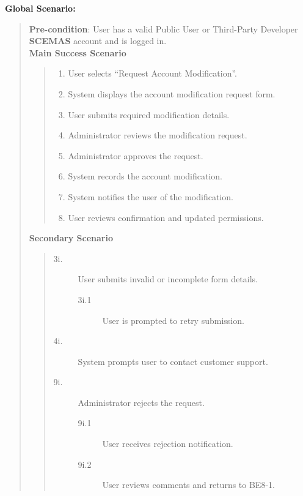 \documentclass[]{article}
\begin{document}
\begin{enumerate}[{\bf BE8.}]
\begin{enumerate}[{\bf VP1.}]
        
\end{enumerate}
{\bf Global Scenario:}
        \begin{quote}
            \textbf{Pre-condition}: User has a valid Public User or Third-Party Developer \textbf{SCEMAS} account and is logged in. \\
            \textbf{Main Success Scenario}
            \begin{quote}
                \begin{enumerate}[1.]
                    \item User selects ``Request Account Modification''.
                    \item System displays the account modification request form.
                    \item User submits required modification details.
                    \item Administrator reviews the modification request.
                    \item Administrator approves the request.
                    \item System records the account modification.
                    \item System notifies the user of the modification.
                    \item User reviews confirmation and updated permissions.
                \end{enumerate}
            \end{quote}
            \textbf{Secondary Scenario}
            \begin{quote}
                \begin{description}
                    \item[\textmd{3i.}] User submits invalid or incomplete form details.
                    \begin{description}
                        \item[\textmd{3i.1}] User is prompted to retry submission.
                    \end{description}
                    \item[\textmd{4i.}] System prompts user to contact customer support.
                    \item[\textmd{9i.}] Administrator rejects the request.
                    \begin{description}
                        \item[\textmd{9i.1}] User receives rejection notification.
                        \item[\textmd{9i.2}] User reviews comments and returns to BE8-1.
                    \end{description}
                    \end{description}
            \end{quote}
        \end{quote}
\end{enumerate}
\end{document}
